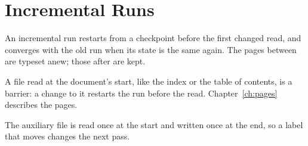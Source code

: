 \chapter{Incremental Runs}\label{ch:incr}
An incremental run restarts from a checkpoint
before the first changed read, and converges with the old run
when its state is the same again. The pages between are typeset
anew; those after are kept.

A file read at the document's start, like the index or the table
of contents, is a barrier: a change to it
restarts the run before the read. Chapter~\ref{ch:pages} describes the pages.

The auxiliary file is read once at the start and written
once at the end, so a label that moves changes the next pass.
